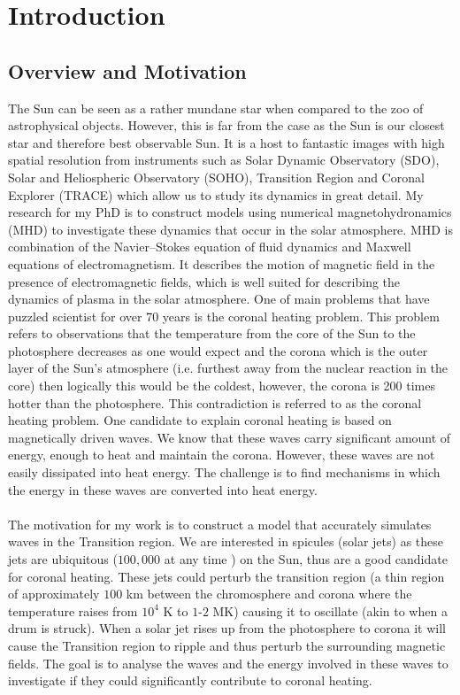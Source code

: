 \documentclass[12pt]{ociamthesis}
\begin{document}
\chapter{Introduction}
\label{chap:intro}
\section{Overview and Motivation}
\label{sec:overview}
The Sun can be seen as a rather mundane star when compared to the zoo of astrophysical objects. However, this is far from the case as the Sun is our closest star and therefore best observable Sun. It is a host to fantastic images with high spatial resolution from instruments such as Solar Dynamic Observatory (SDO), Solar and Heliospheric Observatory (SOHO), Transition Region and Coronal Explorer (TRACE) which allow us to study its dynamics in great detail. My research for my PhD is to construct models using numerical magnetohydronamics (MHD) to investigate these dynamics that occur in the solar atmosphere. MHD is combination of the Navier$–$Stokes equation of fluid dynamics and Maxwell equations of electromagnetism. It describes the motion of magnetic field in the presence of electromagnetic fields, which is well suited for describing the dynamics of plasma in the solar atmosphere. One of main problems that have puzzled scientist for over 70 years is the coronal heating problem. This problem refers to observations that the temperature from the core of the Sun to the photosphere decreases as one would expect and the corona which is the outer layer of the Sun's atmosphere (i.e. furthest away from the nuclear reaction in the core) then logically this would be the coldest, however, the corona is 200 times hotter than the photosphere. This contradiction is referred to as the coronal heating problem. One candidate to explain coronal heating is based on magnetically driven waves. We know that these waves carry significant amount of energy, enough to heat and maintain the corona. However, these waves are not easily dissipated into heat energy. The challenge is to find mechanisms in which the energy in these waves are converted into heat energy.  \\ \\
The motivation for my work is to construct a model that accurately simulates waves in the Transition region. We are interested in spicules (solar jets) as these jets are ubiquitous ($100,000$  at  any  time \citep{Beckers1968}) on the Sun, thus are a good candidate for coronal heating. These jets could perturb the transition region (a thin region of approximately $100$ km between the chromosphere and corona where the temperature raises from $10^4$ K to $1$-$2$ MK) causing it to oscillate (akin to when a drum is struck). When a solar jet rises up from the photosphere to corona it will cause the Transition region to ripple and thus perturb the surrounding magnetic fields. The goal is to analyse the waves and the energy involved in these waves to investigate if they could significantly contribute to coronal heating. 
\end{document}
